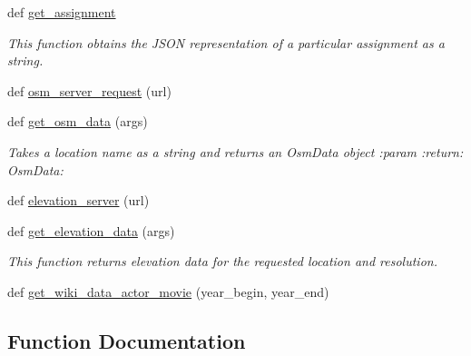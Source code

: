 \begin{DoxyCompactItemize}
def \hyperlink{namespacebridges_1_1data__src__dependent_1_1data__source_add1ea37030fe616297d99cfdf4ae890d}{get\+\_\+assignment}
\begin{DoxyCompactList}\small\item\em This function obtains the J\+S\+ON representation of a particular assignment as a string. \end{DoxyCompactList}\item 
def \hyperlink{namespacebridges_1_1data__src__dependent_1_1data__source_a5644517c9ee0f5ab9e59a4f4d64fa038}{osm\+\_\+server\+\_\+request} (url)
\item 
def \hyperlink{namespacebridges_1_1data__src__dependent_1_1data__source_acbb9052453e120b99ac32b27fd99bb07}{get\+\_\+osm\+\_\+data} (args)
\begin{DoxyCompactList}\small\item\em Takes a location name as a string and returns an Osm\+Data object \+:param \+:return\+: Osm\+Data\+: \end{DoxyCompactList}\item 
def \hyperlink{namespacebridges_1_1data__src__dependent_1_1data__source_a5232b70889e93385e68a7cd1b296123e}{elevation\+\_\+server} (url)
\item 
def \hyperlink{namespacebridges_1_1data__src__dependent_1_1data__source_a5193a0d8e1507b1cedb5de65f1d702bd}{get\+\_\+elevation\+\_\+data} (args)
\begin{DoxyCompactList}\small\item\em This function returns elevation data for the requested location and resolution. \end{DoxyCompactList}\item 
def \hyperlink{namespacebridges_1_1data__src__dependent_1_1data__source_a15db0d52db8b6e096db60f99b2f0171d}{get\+\_\+wiki\+\_\+data\+\_\+actor\+\_\+movie} (year\+\_\+begin, year\+\_\+end)
\end{DoxyCompactItemize}


\subsection{Function Documentation}
\mbox{\label{namespacebridges_1_1data__src__dependent_1_1data__source_a5232b70889e93385e68a7cd1b296123e}} 
